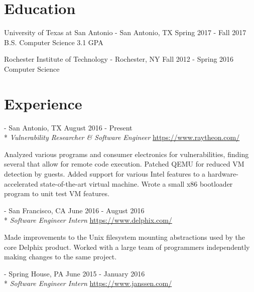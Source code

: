 \documentclass[letterpaper,margin,line,11pt]{resume}
\newcommand{\rurl}[1]{\hfill {\footnotesize \url{#1}}}
\newcommand{\rdate}[1]{\hfill {\small #1}}
\renewcommand{\employer}[5]{\item[#1] - #2 \rdate{#3} \\* #4 \rurl{#5}}
\begin{document}
\begin{resume}
\section{\mysidestyle Education}
    \begin{compactdesc}
        \item[University of Texas at San Antonio] - San Antonio, TX \rdate{Spring 2017 - Fall 2017}
        \small
        \\B.S. Computer Science
        \hfill 3.1 GPA
    \end{compactdesc}
    \begin{compactdesc}
        \item[Rochester Institute of Technology] - Rochester, NY \rdate{Fall 2012 - Spring 2016}
        \small
        \\Computer Science
    \end{compactdesc}

\section{\mysidestyle Experience}
    \begin{asparadesc}
        \employer{Raytheon}{San Antonio, TX} {August 2016 - Present}{\textit{Vulnerability Researcher \& Software Engineer}}{https://www.raytheon.com/}

        \small
	Analyzed various programs and consumer electronics for vulnerabilities, finding several that allow for remote
        code execution. Patched QEMU for reduced VM detection by guests. Added support for various Intel features to a
        hardware-accelerated state-of-the-art virtual machine. Wrote a small x86 bootloader program to unit test VM features.
        \normalsize
        \\

        \employer{Delphix}{San Francisco, CA} {June 2016 - August 2016}{\textit{Software Engineer Intern}}{https://www.delphix.com/}

        \small
        Made improvements to the Unix filesystem mounting abstractions used by the core Delphix product. Worked with a
        large team of programmers independently making changes to the same project.
        \normalsize
        \\

        \employer{Janssen Biotech}{Spring House, PA}{June 2015 - January 2016}{\textit{Software Engineer Intern}}{https://www.janssen.com/}


\end{asparadesc}
\end{resume}
\end{document}
